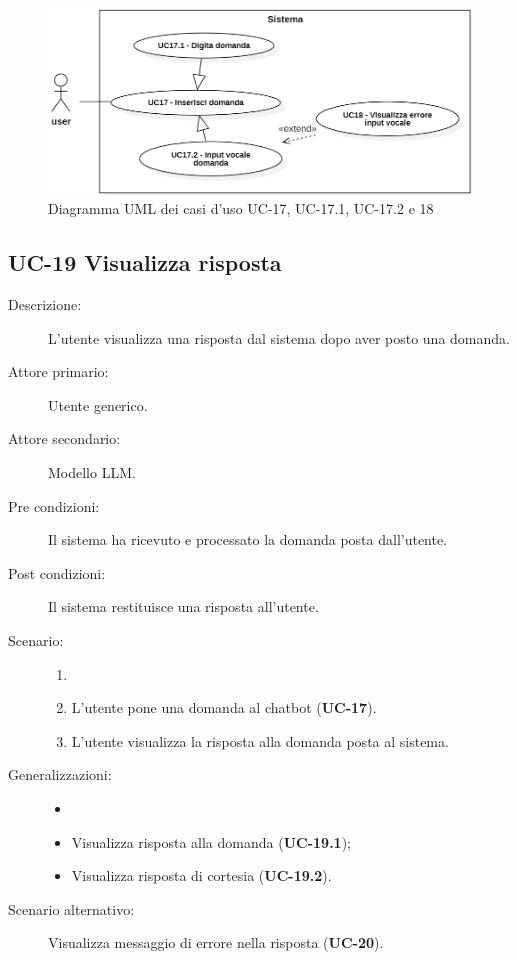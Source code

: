 \begin{figure}[H]
    \centering
    \includegraphics[width=\linewidth]{UC17}
    \caption{Diagramma UML dei casi d'uso UC-17, UC-17.1, UC-17.2 e 18}
    \label{fig:UC16-17}
\end{figure}

\subsection{UC-19 Visualizza risposta}
\begin{description}
    \item[Descrizione:] L'utente visualizza una risposta dal sistema dopo aver posto una domanda.
    \item[Attore primario:] Utente generico.
    \item[Attore secondario:] Modello LLM. 
    \item[Pre condizioni:] Il sistema ha ricevuto e processato la domanda posta dall'utente.
    \item[Post condizioni:] Il sistema restituisce una risposta all'utente.
    \item[Scenario:]
    \begin{enumerate}
        \item[]
        \item L’utente pone una domanda al chatbot (\textbf{UC-17}).
        \item L'utente visualizza la risposta alla domanda posta al sistema.
    \end{enumerate}
    \item[Generalizzazioni:]
    \begin{itemize}
        \item[] 
        \item Visualizza risposta alla domanda (\textbf{UC-19.1});
        \item Visualizza risposta di cortesia (\textbf{UC-19.2}).
    \end{itemize}
    \item[Scenario alternativo:] Visualizza messaggio di errore nella risposta (\textbf{UC-20}).
\end{description}

